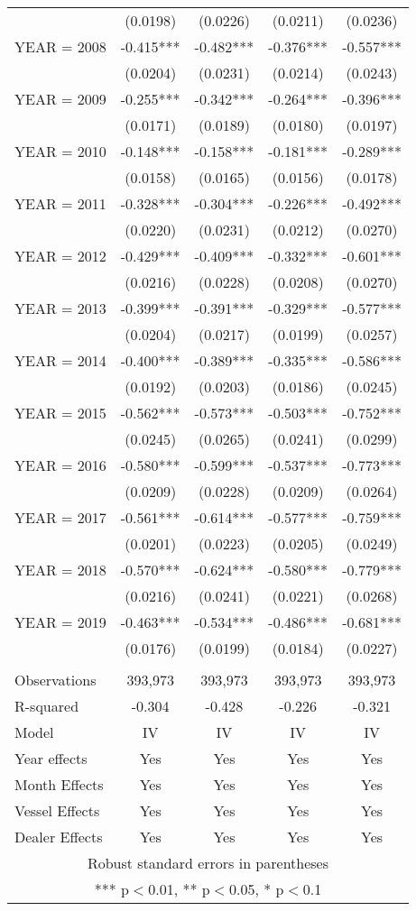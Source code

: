 \begin{tabular}{lcccc}
 & (0.0198) & (0.0226) & (0.0211) & (0.0236) \\
YEAR = 2008 & -0.415*** & -0.482*** & -0.376*** & -0.557*** \\
 & (0.0204) & (0.0231) & (0.0214) & (0.0243) \\
YEAR = 2009 & -0.255*** & -0.342*** & -0.264*** & -0.396*** \\
 & (0.0171) & (0.0189) & (0.0180) & (0.0197) \\
YEAR = 2010 & -0.148*** & -0.158*** & -0.181*** & -0.289*** \\
 & (0.0158) & (0.0165) & (0.0156) & (0.0178) \\
YEAR = 2011 & -0.328*** & -0.304*** & -0.226*** & -0.492*** \\
 & (0.0220) & (0.0231) & (0.0212) & (0.0270) \\
YEAR = 2012 & -0.429*** & -0.409*** & -0.332*** & -0.601*** \\
 & (0.0216) & (0.0228) & (0.0208) & (0.0270) \\
YEAR = 2013 & -0.399*** & -0.391*** & -0.329*** & -0.577*** \\
 & (0.0204) & (0.0217) & (0.0199) & (0.0257) \\
YEAR = 2014 & -0.400*** & -0.389*** & -0.335*** & -0.586*** \\
 & (0.0192) & (0.0203) & (0.0186) & (0.0245) \\
YEAR = 2015 & -0.562*** & -0.573*** & -0.503*** & -0.752*** \\
 & (0.0245) & (0.0265) & (0.0241) & (0.0299) \\
YEAR = 2016 & -0.580*** & -0.599*** & -0.537*** & -0.773*** \\
 & (0.0209) & (0.0228) & (0.0209) & (0.0264) \\
YEAR = 2017 & -0.561*** & -0.614*** & -0.577*** & -0.759*** \\
 & (0.0201) & (0.0223) & (0.0205) & (0.0249) \\
YEAR = 2018 & -0.570*** & -0.624*** & -0.580*** & -0.779*** \\
 & (0.0216) & (0.0241) & (0.0221) & (0.0268) \\
YEAR = 2019 & -0.463*** & -0.534*** & -0.486*** & -0.681*** \\
 & (0.0176) & (0.0199) & (0.0184) & (0.0227) \\
 &  &  &  &  \\
Observations & 393,973 & 393,973 & 393,973 & 393,973 \\
R-squared & -0.304 & -0.428 & -0.226 & -0.321 \\
Model & IV & IV & IV & IV \\
Year effects & Yes & Yes & Yes & Yes \\
Month Effects & Yes & Yes & Yes & Yes \\
Vessel Effects & Yes & Yes & Yes & Yes \\
 Dealer Effects & Yes & Yes & Yes & Yes \\ \hline
\multicolumn{5}{c}{ Robust standard errors in parentheses} \\
\multicolumn{5}{c}{ *** p$<$0.01, ** p$<$0.05, * p$<$0.1} \\
\end{tabular}
